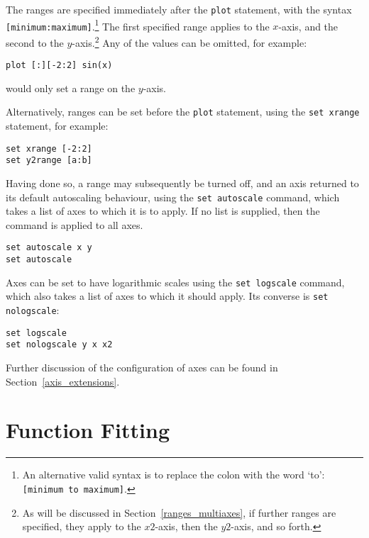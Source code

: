 \noindent The ranges are specified immediately after the \texttt{plot}
statement, with the syntax \texttt{[minimum:maximum]}.\footnote{An alternative
valid syntax is to replace the colon with the word `to': \texttt{[minimum to
maximum]}.} The first specified range applies to the $x$-axis, and the second
to the $y$-axis.\footnote{As will be discussed in
Section~\ref{ranges_multiaxes}, if further ranges are specified, they apply to
the $x2$-axis, then the $y2$-axis, and so forth.} Any of the values can be
omitted, for example:

\begin{verbatim}
plot [:][-2:2] sin(x)
\end{verbatim}

\noindent would only set a range on the $y$-axis.

Alternatively, ranges can be set before the \texttt{plot} statement, using the
\texttt{set xrange}
statement, for example:

\begin{verbatim}
set xrange [-2:2]
set y2range [a:b]
\end{verbatim}

Having done so, a range may subsequently be turned off, and an axis returned to
its default autoscaling behaviour, using the \texttt{set autoscale} command, which takes a list
of axes to which it is to apply. If no list is supplied, then the command is
applied to all axes.

\begin{verbatim}
set autoscale x y
set autoscale
\end{verbatim}

Axes can be set to have logarithmic scales using the \texttt{set
logscale} command,
which also takes a list of axes to which it should apply. Its converse is
\texttt{set nologscale}:

\begin{verbatim}
set logscale
set nologscale y x x2
\end{verbatim}

Further discussion of the configuration of axes can be found in
Section~\ref{axis_extensions}.

\section{Function Fitting}
\label{fit_command}

